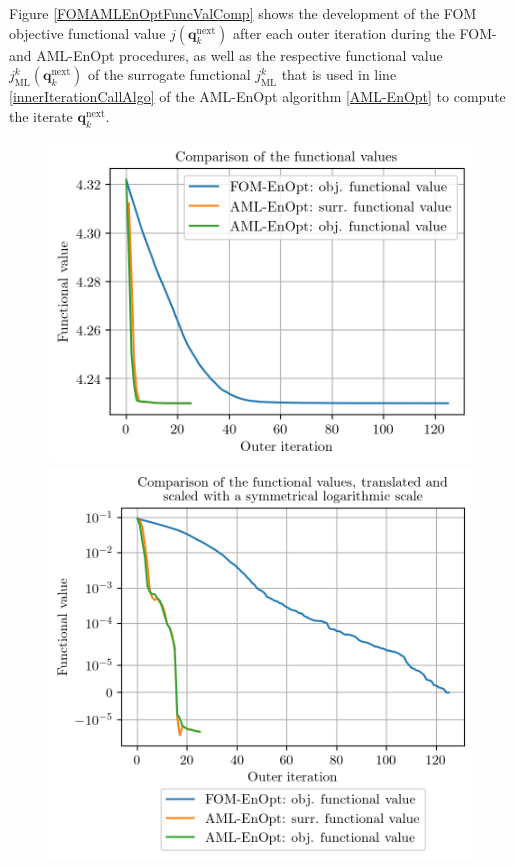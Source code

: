 Figure \ref{FOMAMLEnOptFuncValComp} shows the development of the FOM objective functional value $j(\mathbf{q}^\mathrm{next}_k)$ after each outer iteration during the FOM- and AML-EnOpt procedures, as well as the respective functional value $j^k_\mathrm{ML}(\mathbf{q}^\mathrm{next}_k)$ of the surrogate functional $j_\mathrm{ML}^k$ that is used in line \ref{innerIterationCallAlgo} of the AML-EnOpt algorithm \ref{AML-EnOpt} to compute the iterate $\mathbf{q}^\mathrm{next}_k$.

\begin{figure}
\centering
\includegraphics{Plots/functionalValueComp.png}
\includegraphics{Plots/functionalValueCompSymlog.png}

\end{figure}
